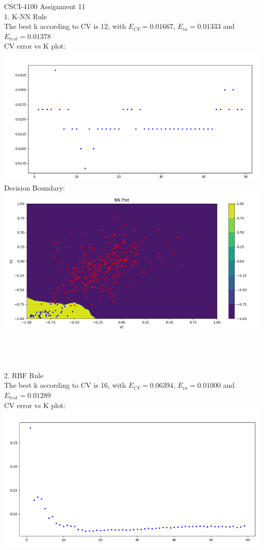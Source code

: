 \documentclass[12pt]{article}
\begin{document}
CSCI-4100 Assignment 11\\
1. K-NN Rule\\
The best k according to CV is 12, with $E_{CV}=0.01667$, $E_{in}=0.01333$ and $E_{test}=0.01378$\\
CV error vs K plot:\\
\includegraphics[scale=0.6]{images/knn_ecv_plot}\\
Decision Boundary:\\
\includegraphics[scale=0.6]{images/knn_decision_boundary}\\\\\\\\\\
2. RBF Rule\\
The best k according to CV is 16, with $E_{CV}=0.06394$, $E_{in}=0.01000$ and $E_{test}=0.01289$\\
CV error vs K plot:\\
\includegraphics[scale=0.6]{images/rbf_ecv_plot}\\
\end{document}
